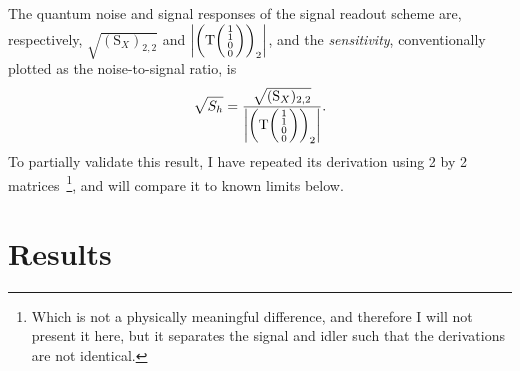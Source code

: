 The quantum noise and signal responses of the signal readout scheme are, respectively, $\sqrt{(\text{S}_X)_{2,2}}$ and $\abs{\left(\text{T}\begin{psmallmatrix}1 \\1\\0\\0\end{psmallmatrix}\right)_2}$, and the \emph{sensitivity}, conventionally plotted as the noise-to-signal ratio, is
\begin{equation}\label{eq:nIS_sigRO_sens}
\sqrt{S_h} = \frac{\sqrt{(\text{S}_X)_{2,2}}}{\abs{\left(\text{T}\begin{psmallmatrix}1 \\1\\0\\0\end{psmallmatrix}\right)_2}}.
\end{equation}
To partially validate this result, I have repeated its derivation using 2 by 2 matrices~\footnote{Which is not a physically meaningful difference, and therefore I will not present it here, but it separates the signal and idler such that the derivations are not identical.}, and will compare it to known limits below. %


\section{Results}
\label{sec:nIS_sigRO_results}

